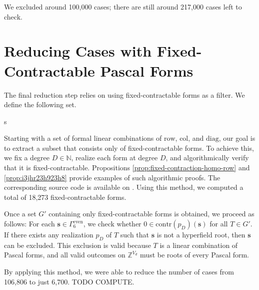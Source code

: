 We excluded around 100,000 cases; there are still around 217,000 cases left to check.

\section{Reducing Cases with Fixed-Contractable Pascal Forms}

The final reduction step relies on using fixed-contractable forms as a filter. We define the following set.

\begin{proposition}
    s
\end{proposition}

Starting with a set of formal linear combinations of \( \mathrm{row} \), \( \mathrm{col} \), and \( \mathrm{diag} \), our goal is to extract a subset that consists only of fixed-contractable forms. To achieve this, we fix a degree \( D \in \mathbb{N} \), realize each form at degree \( D \), and algorithmically verify that it is fixed-contractable. Propositions \ref{prop:fixed-contraction-homo-row} and \ref{prop:i3jhr23h923h8} provide examples of such algorithmic proofs. The corresponding source code is available on \cite{ducrepo}. Using this method, we computed a total of 18,273 fixed-contractable forms.

Once a set \( G' \) containing only fixed-contractable forms is obtained, we proceed as follows: For each \( \mathbf{s} \in \Gamma^{\mathrm{even}}_6 \), we check whether \( 0 \in \mathrm{contr}(p_D)(\mathbf{s}) \) for all \( T \in G' \). If there exists any realization \( p_D \) of \( T \) such that \( \mathbf{s} \) is not a hyperfield root, then \( \mathbf{s} \) can be excluded. This exclusion is valid because \( T \) is a linear combination of Pascal forms, and all valid outcomes on \( \mathbb{Z}^{V_d} \) must be roots of every Pascal form. 

By applying this method, we were able to reduce the number of cases from 106,806 to just 6,700. TODO COMPUTE.
